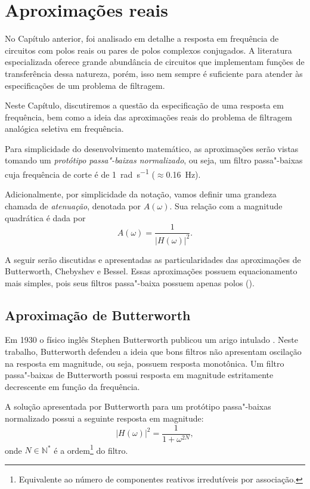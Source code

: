 \chapter{Aproximações reais}

No Capítulo anterior, foi analisado em detalhe a resposta em frequência de circuitos com polos reais ou pares de polos complexos conjugados. A literatura especializada oferece grande abundância de circuitos que implementam funções de transferência dessa natureza, porém, isso nem sempre é suficiente para atender às especificações de um problema de filtragem.

Neste Capítulo, discutiremos a questão da especificação de uma resposta em frequência, bem como a ideia das aproximações reais do problema de filtragem analógica seletiva em frequência.

Para simplicidade do desenvolvimento matemático, as aproximações serão vistas tomando um \emph{protótipo passa"-baixas normalizado}, ou seja, um filtro passa"-baixas cuja frequência de corte é de \qty{1}{\radian\per\second} ($\approx$\qty{0.16}{\hertz}).

Adicionalmente, por simplicidade da notação, vamos definir uma grandeza chamada de \emph{atenuação}, denotada por $A(\omega)$. Sua relação com a magnitude quadrática é dada por
\begin{equation}
	A(\omega)=\frac{1}{|H(\omega)|^2}.
\end{equation}

A seguir serão discutidas e apresentadas as particularidades das aproximações de Butterworth, Chebyshev e Bessel. Essas aproximações possuem equacionamento mais simples, pois seus filtros passa"-baixa possuem apenas polos ().

\section{Aproximação de Butterworth}

Em 1930 o físico inglês Stephen Butterworth publicou um arigo intulado . Neste trabalho, Butterworth defendeu a ideia que bons filtros não apresentam oscilação na resposta em magnitude, ou seja, possuem resposta monotônica. Um filtro passa"-baixas de Butterworth possui resposta em magnitude estritamente decrescente em função da frequência.

A solução apresentada por Butterworth para um protótipo passa"-baixas normalizado possui a seguinte resposta em magnitude:
\begin{equation}\label{eq:buttap}
	|H(\omega)|^2=\frac{1}{1+\omega^{2N}},
\end{equation}
onde $N\in\mathbb{N}^*$ é a ordem\footnote{Equivalente ao número de componentes reativos irredutíveis por associação.} do filtro.

